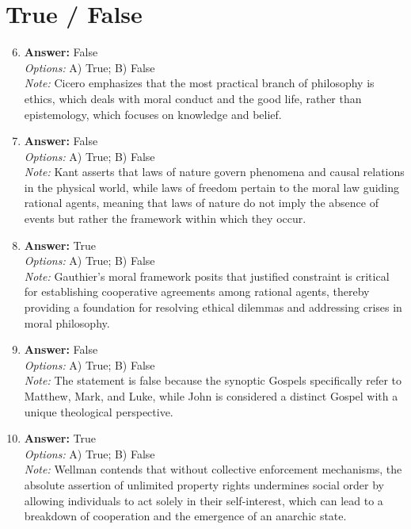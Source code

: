 \documentclass[12pt]{article}
\begin{document}
\section*{True / False}
\begin{enumerate}[label=\arabic*.]
\setcounter{enumi}{5}
\item \textbf{Answer:} False
\\ \textit{Options:} A) True; B) False
\\ \textit{Note:} Cicero emphasizes that the most practical branch of philosophy is ethics, which deals with moral conduct and the good life, rather than epistemology, which focuses on knowledge and belief.
\item \textbf{Answer:} False
\\ \textit{Options:} A) True; B) False
\\ \textit{Note:} Kant asserts that laws of nature govern phenomena and causal relations in the physical world, while laws of freedom pertain to the moral law guiding rational agents, meaning that laws of nature do not imply the absence of events but rather the framework within which they occur.
\item \textbf{Answer:} True
\\ \textit{Options:} A) True; B) False
\\ \textit{Note:} Gauthier's moral framework posits that justified constraint is critical for establishing cooperative agreements among rational agents, thereby providing a foundation for resolving ethical dilemmas and addressing crises in moral philosophy.
\item \textbf{Answer:} False
\\ \textit{Options:} A) True; B) False
\\ \textit{Note:} The statement is false because the synoptic Gospels specifically refer to Matthew, Mark, and Luke, while John is considered a distinct Gospel with a unique theological perspective.
\item \textbf{Answer:} True
\\ \textit{Options:} A) True; B) False
\\ \textit{Note:} Wellman contends that without collective enforcement mechanisms, the absolute assertion of unlimited property rights undermines social order by allowing individuals to act solely in their self-interest, which can lead to a breakdown of cooperation and the emergence of an anarchic state.
\end{enumerate}
\end{document}
